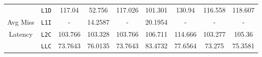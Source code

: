 \documentclass[11pt, swedish, openany]{book}
\begin{document}
\begin{table}[H]
\begin{tabular}{||c|c||c||c|c||c|c||c|c||}
        \hline
                                            & \texttt{L1D} & 117.04                    & 52.756   & 117.026     & 101.301  & 130.94   & 116.558  & 118.607  \\
        Avg Miss                            & \texttt{L1I} & -                         & 14.2587  & -           & 20.1954  & -        & -        & -        \\
        Latency                             & \texttt{L2C} & 103.766                   & 103.328  & 103.766     & 106.711  & 114.666  & 103.277  & 105.36   \\
                                            & \texttt{LLC} & 73.7643                   & 76.0135  & 73.7643     & 83.4732  & 77.6564  & 73.275   & 75.3581  \\
        \hline
    \end{tabular}
\end{table}
\end{document}
